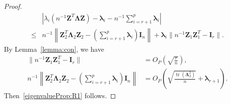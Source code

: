 \documentclass[12pt]{article} %
\DeclareMathOperator{\mytr}{tr}
\newcommand{\bZ}{\mathbf{Z}}
\newcommand{\bI}{\mathbf{I}}
\newcommand{\bfsym}[1]{\ensuremath{\boldsymbol{#1}}}
\def\blambda {\bfsym {\lambda}}
\def\bLambda {\bfsym {\Lambda}}
\theoremstyle{definition}
\begin{document}
\begin{appendices}
\begin{proof}
\begin{equation*}
    \begin{split}
        &
        \left|
        \lambda_i\left(n^{-1}\bZ^T \bLambda \bZ\right)
        -
        \blambda_i
        -
        n^{-1}\sum_{i=r+1}^p\blambda_i
        \right|
        \\
        \leq&
        n^{-1}\left\|\bZ_2^T \bLambda_2 \bZ_2-(\sum_{i=r+1}^p\blambda_i)\bI_n\right\|
        +\blambda_i \|n^{-1}\bZ_1\bZ_1^T -\bI_r\|.
    \end{split}
\end{equation*}
    By Lemma~\ref{lemma:con}, we have
\begin{align}
    \label{conB2B1}
            \|n^{-1}\bZ_1\bZ_1^T -\bI_r\|&=
            O_P\left(\sqrt{\frac{r}{n}}\right),
        \\
        \label{conB2B}
        n^{-1}\left\|\bZ_2^T \bLambda_2 \bZ_2-(\sum_{i=r+1}^p\blambda_i)\bI_n\right\|&=O_P\left(\sqrt{\frac{\mytr(\bLambda_2^2)}{ n}}+\blambda_{r+1}\right).
\end{align}
Then~\eqref{eigenvalueProp:R1} follows.


\end{proof}
\end{appendices}
\end{document}
